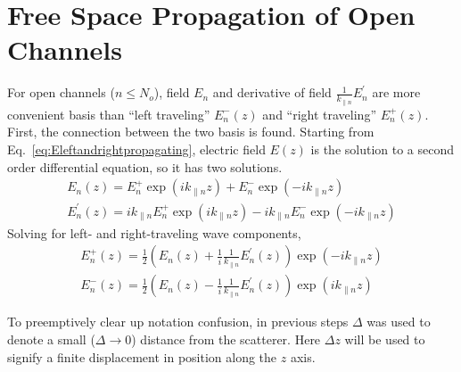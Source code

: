 \section{Free Space Propagation of Open Channels}
For open channels ($n \leq N_o$), field $E_n$ and derivative of field $ \frac{1}{k_{\parallel n}}E_n^{\prime}$ are more convenient basis than ``left traveling'' $E_n^-(z)$ and ``right traveling'' $E_n^+(z)$. First, the connection between the two basis is found. Starting from Eq.~\ref{eq:Eleftandrightpropagating}, electric field $E(z)$ is the solution to a second order differential equation, so it has two solutions.
\begin{equation}
\begin{gathered}
E_n(z) = E_n^+ \exp(i k_{\parallel n} z) + E_n^- \exp(-i k_{\parallel n} z) \\
E_n^{\prime}(z) = i k_{\parallel n} E_n^+ \exp(i k_{\parallel n} z) - i k_{\parallel n}E_n^- \exp(-i k_{\parallel n} z)
\label{eq:Eleftandrightpropagating_again}
\end{gathered}
\end{equation}
Solving for left- and right-traveling wave components,
\begin{equation}
\begin{gathered}
E_n^+(z) = \frac{1}{2} \left( E_n(z)+\frac{1}{i} \frac{1}{k_{\parallel n}} E_n^{\prime}(z) \right) \exp(-i k_{\parallel n} z) \\ 
E_n^-(z) = \frac{1}{2} \left( E_n(z)-\frac{1}{i} \frac{1}{k_{\parallel n}} E_n^{\prime}(z) \right) \exp(i k_{\parallel n} z) 
\label{eq:Eleftright}
\end{gathered}
\end{equation}

To preemptively clear up notation confusion, in previous steps $\Delta$ was used to denote a small ($\Delta \rightarrow 0$) distance from the scatterer. Here $\Delta z$ will be used to signify a finite displacement in position along the $z$ axis. 

